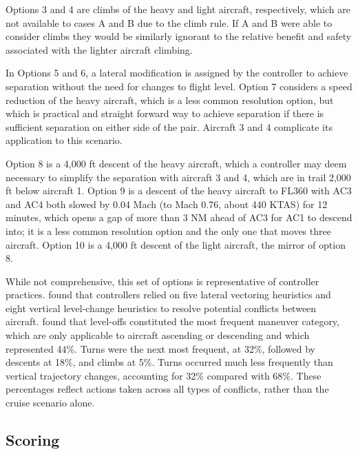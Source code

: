 Options 3 and 4 are climbs of the heavy and light aircraft, respectively, which are not available to cases A and B due to the climb rule. If A and B were able to consider climbs they would be similarly ignorant to the relative benefit and safety associated with the lighter aircraft climbing. 

In Options 5 and 6, a lateral modification is assigned by the controller to achieve separation without the need for changes to flight level. Option 7 considers a speed reduction of the heavy aircraft, which is a less common resolution option, but which is practical and straight forward way to achieve separation if there is sufficient separation on either side of the pair. Aircraft 3 and 4 complicate its application to this scenario. 

Option 8 is a 4,000 ft descent of the heavy aircraft, which a controller may deem necessary to simplify the separation with aircraft 3 and 4, which are in trail 2,000 ft below aircraft 1. Option 9 is a descent of the heavy aircraft to FL360 with AC3 and AC4 both slowed by 0.04 Mach (to Mach 0.76, about 440 KTAS) for 12 minutes, which opens a gap of more than 3 NM ahead of AC3 for AC1 to descend into; it is a less common resolution option and the only one that moves three aircraft. Option 10 is a 4,000 ft descent of the light aircraft, the mirror of option 8.


While not comprehensive, this set of options is representative of controller practices. \cite{fothergill2013resolutionHeuristics} found that controllers relied on five lateral vectoring heuristics and eight vertical level-change heuristics to resolve potential conflicts between aircraft. \cite{rantanen2012conflictManeuvers} found that level-offs constituted the most frequent maneuver category, which are only applicable to aircraft ascending or descending and which represented 44\%. Turns were the next most frequent, at 32\%, followed by descents at 18\%, and climbs at 5\%. Turns occurred much less frequently than vertical trajectory changes, accounting for 32\% compared with 68\%. These percentages reflect actions taken across all types of conflicts, rather than the cruise scenario alone. 

\subsection{Scoring}
\label{sec:scoring-method}

